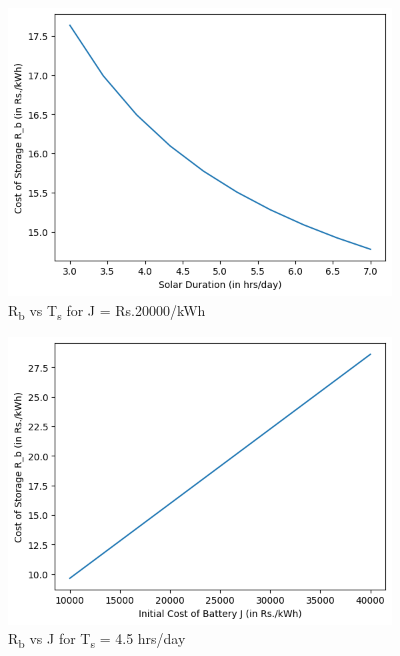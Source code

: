 \documentclass{article}
\begin{document}
\begin{figure}[H]
	\centering
	\includegraphics[height=3in]{Rb vs Ts.png}
	\caption[Optional Caption]{R\textsubscript{b} vs T\textsubscript{s} for J = Rs.20000/kWh}
	\label{fig:Ts}
\end{figure}
\newpage
\begin{figure}[H]
	\centering
	\includegraphics[height=3in]{Rb vs J.png}
	\caption[Optional Caption]{R\textsubscript{b} vs J for T\textsubscript{s} = 4.5 hrs/day}
	\label{fig:J}
\end{figure}
\end{document}
